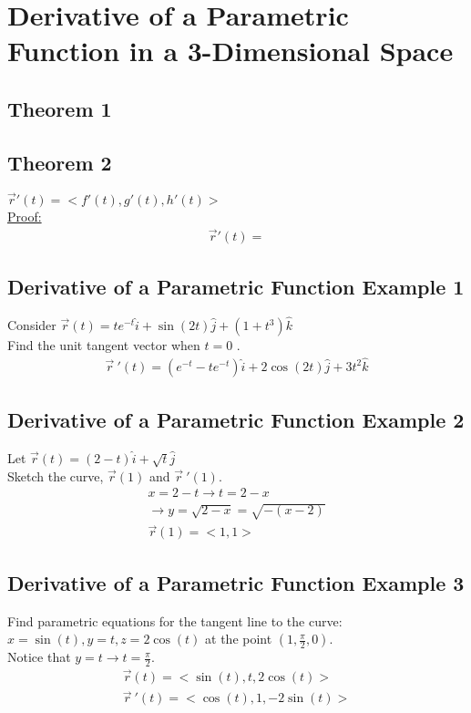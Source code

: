 \documentclass[12pt]{article}
\begin{document}
\section{Derivative of a Parametric Function in a 3-Dimensional Space}
\subsection{Theorem 1}

\subsection{Theorem 2}
\(\vec{r} '(t) = <f'(t),g'(t),h'(t)> \) \\%
\underline{Proof:} 
\begin{align}
	\label{eq:Derivative of parametric function r(t) }
	\vec{r} '(t) =  	
\end{align}

\subsection{Derivative of a Parametric Function Example 1}
Consider \(\vec{r} (t) = te^{-t}\hat{i} + \sin(2t)\hat{j}+(1+t^3)\hat{k} \)   \\%
Find the unit tangent vector when \(t=0\) .
\begin{align}
	\vec{r}\ '(t)=(e^{-t}-te^{-t})\hat{i} + 2\cos(2t)\hat{j} + 3t^2\hat{k} 
\end{align}
\subsection{Derivative of a Parametric Function Example 2}
Let \(\vec{r} (t) = (2-t)\hat{i} + \sqrt{t}\hat{j} \) \\%
Sketch the curve, \(\vec{r} (1) \) and \(\vec{r} \ '(1) \). 
\begin{align}
	\label{eq:Example 2 - Derivative of Parametric Function}
	x=2-t \rightarrow t=2-x \\%
	\rightarrow y=\sqrt{2-x}=\sqrt{-(x-2)}	\\%
	\vec{r} (1) = <1,1> 
\end{align}

\subsection{Derivative of a Parametric Function Example 3}	
Find parametric equations for the tangent line to the curve:\\%
\(x=\sin(t),y=t,z=2\cos(t)\) at the point \((1,\frac{\pi}{2},0)\). \\%
Notice that \(y=t  \rightarrow t = \frac{\pi}{2}\).
\begin{align}
	\vec{r} (t)=<\sin(t),t,2\cos(t)>\\%
	\vec{r} \ '(t) = <\cos(t),1,-2\sin(t)> 
\end{align}
\end{document}

